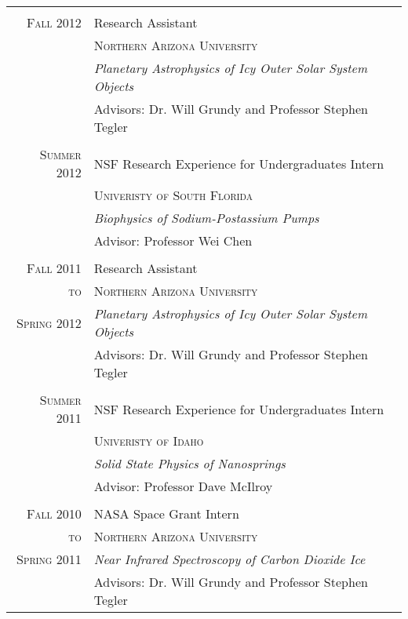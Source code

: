 \documentclass[letterpaper,10pt]{article} %
\begin{document}
\begin{tabular}{r|p{11cm}}
\multicolumn{2}{c}{}\\


\textsc{Fall 2012} & Research Assistant \\
& \textsc{Northern Arizona University} \\
&\emph{Planetary Astrophysics of Icy Outer Solar System Objects}\\ 
& Advisors: Dr. Will Grundy and Professor Stephen Tegler \\
\multicolumn{2}{c}{} \\


\textsc{Summer 2012} & NSF Research Experience for Undergraduates Intern \\
& \textsc{Univeristy of South Florida} \\
&\emph{Biophysics of Sodium-Postassium Pumps}\\ 
& Advisor: Professor Wei Chen \\
\multicolumn{2}{c}{} \\


\textsc{Fall 2011} & Research Assistant \\
\textsc{to} & \textsc{Northern Arizona University} \\
\textsc{Spring 2012} &\emph{Planetary Astrophysics of Icy Outer Solar System Objects}\\ 
& Advisors: Dr. Will Grundy and Professor Stephen Tegler \\
\multicolumn{2}{c}{} \\


\textsc{Summer 2011} & NSF Research Experience for Undergraduates Intern \\
& \textsc{Univeristy of Idaho} \\
&\emph{Solid State Physics of Nanosprings}\\ 
& Advisor: Professor Dave McIlroy \\

\multicolumn{2}{c}{} \\


\textsc{Fall 2010} & NASA Space Grant Intern\\
\textsc{to} & \textsc{Northern Arizona University} \\
\textsc{Spring 2011} &\emph{Near Infrared Spectroscopy of Carbon Dioxide Ice}\\ 
& Advisors: Dr. Will Grundy and Professor Stephen Tegler \\


\end{tabular}
\end{document}
